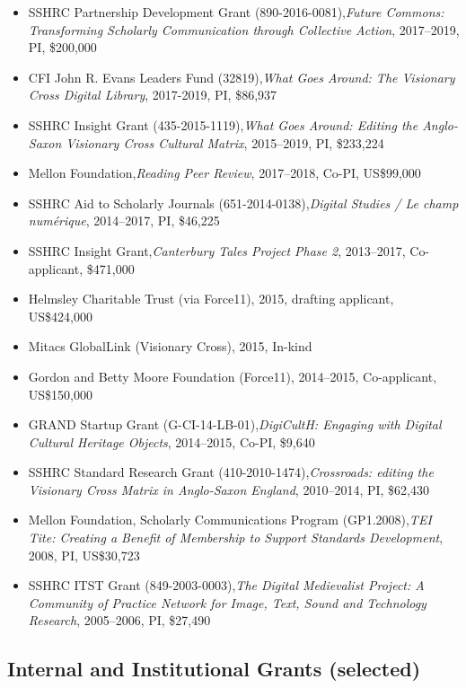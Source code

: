 \documentclass[12pt]{article}
\begin{document}
\begin{itemize}
  \item SSHRC Partnership Development Grant (890-2016-0081),\textit{Future Commons: Transforming Scholarly Communication through Collective Action}, 2017–2019, PI, \$200,000
  \item CFI John R. Evans Leaders Fund (32819),\textit{What Goes Around: The Visionary Cross Digital Library}, 2017-2019, PI, \$86,937
  \item SSHRC Insight Grant (435-2015-1119),\textit{What Goes Around: Editing the Anglo-Saxon Visionary Cross Cultural Matrix}, 2015–2019, PI, \$233,224
  \item Mellon Foundation,\textit{Reading Peer Review}, 2017–2018, Co-PI, US\$99,000
  \item SSHRC Aid to Scholarly Journals (651-2014-0138),\textit{Digital Studies / Le champ numérique}, 2014–2017, PI, \$46,225
  \item SSHRC Insight Grant,\textit{Canterbury Tales Project Phase 2}, 2013–2017, Co-applicant, \$471,000
  \item Helmsley Charitable Trust (via Force11), 2015, drafting applicant, US\$424,000
  \item Mitacs GlobalLink (Visionary Cross), 2015, In-kind
  \item Gordon and Betty Moore Foundation (Force11), 2014–2015, Co-applicant, US\$150,000
  \item GRAND Startup Grant (G-CI-14-LB-01),\textit{DigiCultH: Engaging with Digital Cultural Heritage Objects}, 2014–2015, Co-PI, \$9,640
  \item SSHRC Standard Research Grant (410-2010-1474),\textit{Crossroads: editing the Visionary Cross Matrix in Anglo-Saxon England}, 2010–2014, PI, \$62,430
  \item Mellon Foundation, Scholarly Communications Program (GP1.2008),\textit{TEI Tite: Creating a Benefit of Membership to Support Standards Development}, 2008, PI, US\$30,723
  \item SSHRC ITST Grant (849-2003-0003),\textit{The Digital Medievalist Project: A Community of Practice Network for Image, Text, Sound and Technology Research}, 2005–2006, PI, \$27,490
\end{itemize}


\subsection*{Internal and Institutional Grants (selected)}
\end{document}
